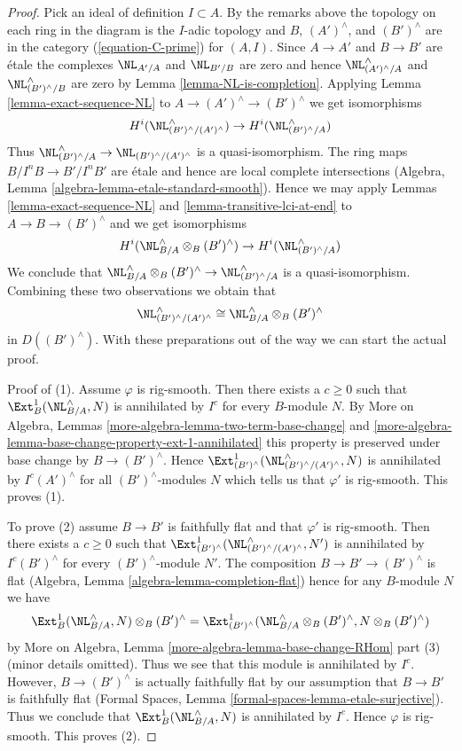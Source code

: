 \begin{proof}
\medskip\noindent
Pick an ideal of definition $I \subset A$. By the remarks above
the topology on each ring in the diagram is the $I$-adic topology
and $B$, $(A')^\wedge$, and $(B')^\wedge$ are in the category
(\ref{equation-C-prime}) for $(A, I)$.
Since $A \to A'$ and $B \to B'$ are \'etale the complexes
$\NL_{A'/A}$ and $\NL_{B'/B}$ are zero and hence
$\NL_{(A')^\wedge/A}^\wedge$ and $\NL_{(B')^\wedge/B}^\wedge$
are zero by Lemma \ref{lemma-NL-is-completion}.
Applying Lemma \ref{lemma-exact-sequence-NL} to
$A \to (A')^\wedge \to (B')^\wedge$ we get isomorphisms
$$
H^i(\NL_{(B')^\wedge/(A')^\wedge}^\wedge) \to H^i(\NL_{(B')^\wedge/A}^\wedge)
$$
Thus $\NL_{(B')^\wedge/A}^\wedge \to \NL_{(B')^\wedge/(A')^\wedge}$
is a quasi-isomorphism. The ring maps $B/I^nB \to B'/I^nB'$ are \'etale
and hence are local complete intersections
(Algebra, Lemma \ref{algebra-lemma-etale-standard-smooth}).
Hence we may apply
Lemmas \ref{lemma-exact-sequence-NL} and
\ref{lemma-transitive-lci-at-end} to
$A \to B \to (B')^\wedge$ and we get isomorphisms
$$
H^i(\NL_{B/A}^\wedge \otimes_B (B')^\wedge) \to
H^i(\NL_{(B')^\wedge/A}^\wedge)
$$
We conclude that
$\NL_{B/A}^\wedge \otimes_B (B')^\wedge \to \NL_{(B')^\wedge/A}^\wedge$
is a quasi-isomorphism. Combining these two observations we obtain that
$$
\NL_{(B')^\wedge/(A')^\wedge}^\wedge \cong
\NL_{B/A}^\wedge \otimes_B (B')^\wedge
$$
in $D((B')^\wedge)$.
With these preparations out of the way we can start the actual proof.

\medskip\noindent
Proof of (1). Assume $\varphi$ is rig-smooth. Then there exists a $c \geq 0$
such that $\Ext^1_B(\NL_{B/A}^\wedge, N)$ is annihilated by $I^c$
for every $B$-module $N$. By
More on Algebra, Lemmas \ref{more-algebra-lemma-two-term-base-change} and
\ref{more-algebra-lemma-base-change-property-ext-1-annihilated}
this property is preserved under base change by $B \to (B')^\wedge$.
Hence $\Ext^1_{(B')^\wedge}(\NL_{(B')^\wedge/(A')^\wedge}^\wedge, N)$
is annihilated by $I^c(A')^\wedge$ for all $(B')^\wedge$-modules $N$
which tells us that $\varphi'$ is rig-smooth.
This proves (1).

\medskip\noindent
To prove (2) assume $B \to B'$ is faithfully flat and that $\varphi'$
is rig-smooth. Then there exists a $c \geq 0$ such that
$\Ext^1_{(B')^\wedge}(\NL_{(B')^\wedge/(A')^\wedge}^\wedge, N')$
is annihilated by $I^c(B')^\wedge$ for every $(B')^\wedge$-module $N'$.
The composition $B \to B' \to (B')^\wedge$ is flat
(Algebra, Lemma \ref{algebra-lemma-completion-flat})
hence for any $B$-module $N$ we have
$$
\Ext^1_B(\NL_{B/A}^\wedge, N) \otimes_B (B')^\wedge =
\Ext^1_{(B')^\wedge}(\NL_{B/A}^\wedge \otimes_B (B')^\wedge,
N \otimes_B (B')^\wedge)
$$
by More on Algebra, Lemma \ref{more-algebra-lemma-base-change-RHom} part (3)
(minor details omitted). Thus we see that this module is annihilated
by $I^c$. However, $B \to (B')^\wedge$ is actually faithfully flat
by our assumption that $B \to B'$ is faithfully flat (Formal Spaces, Lemma
\ref{formal-spaces-lemma-etale-surjective}). Thus we conclude that
$\Ext^1_B(\NL_{B/A}^\wedge, N)$ is annihilated by $I^c$.
Hence $\varphi$ is rig-smooth. This proves (2).


\end{proof}
